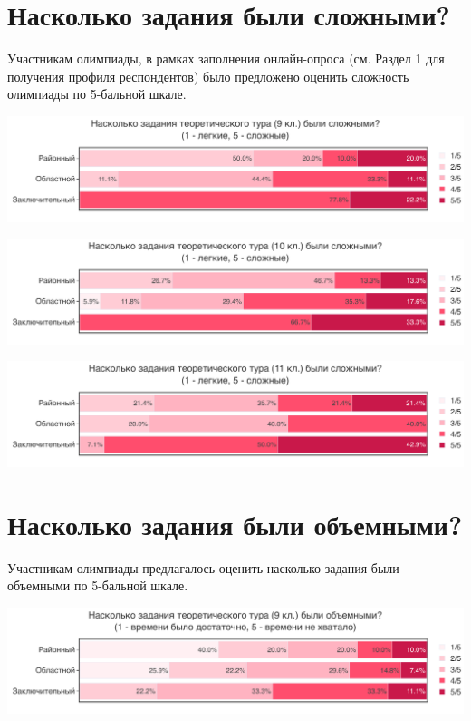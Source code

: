\section{Насколько задания были сложными?}

Участникам олимпиады, в рамках заполнения онлайн-опроса (см. Раздел 1 для получения профиля респондентов) было предложено оценить сложность олимпиады по 5-бальной шкале.

\includegraphics[width=\linewidth]{../export/pdf/demographics/difficulty-grade9.pdf}

\includegraphics[width=\linewidth]{../export/pdf/demographics/difficulty-grade10.pdf}

\includegraphics[width=\linewidth]{../export/pdf/demographics/difficulty-grade11.pdf}

\newpage
\section{Насколько задания были объемными?}

Участникам олимпиады предлагалось оценить насколько задания были объемными по 5-бальной шкале.

\includegraphics[width=\linewidth]{../export/pdf/demographics/volume-grade9.pdf}

